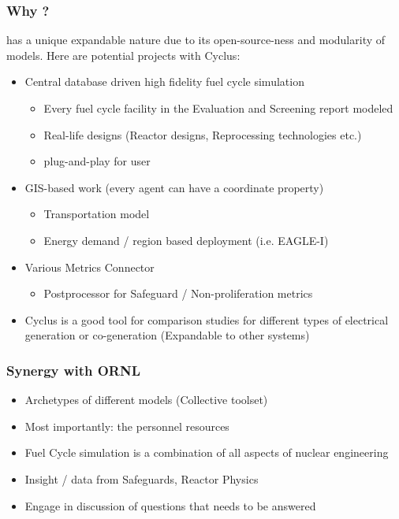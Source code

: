 \begin{frame}
    \frametitle{Why \Cyclus?}
    \Cyclus has a unique expandable nature due to its open-source-ness and
    modularity of models. Here are potential projects with Cyclus:
    \begin{itemize}
        \item Central database driven high fidelity fuel cycle simulation
        \begin{itemize}
            \item Every fuel cycle facility in the Evaluation and Screening report modeled
            \item Real-life designs (Reactor designs, Reprocessing technologies etc.)
            \item plug-and-play for user
        \end{itemize}
        \item GIS-based work (every agent can have a coordinate property)
        \begin{itemize}
            \item Transportation model
            \item Energy demand / region based deployment (i.e. EAGLE-I)
        \end{itemize}
        \item Various Metrics Connector
        \begin{itemize}
        	\item Postprocessor for Safeguard / Non-proliferation metrics
        \end{itemize}
        \item Cyclus is a good tool for comparison studies for different types of electrical generation or co-generation (Expandable to other systems)
    \end{itemize}
\end{frame}


\begin{frame}
	\frametitle{Synergy with ORNL}
	\begin{itemize}
        \item Archetypes of different models (Collective toolset)
		\item Most importantly: the personnel resources
		\item Fuel Cycle simulation is a combination of all aspects of nuclear engineering
		\item Insight / data from Safeguards, Reactor Physics
		\item Engage in discussion of questions that needs to be answered
	\end{itemize}
\end{frame}


